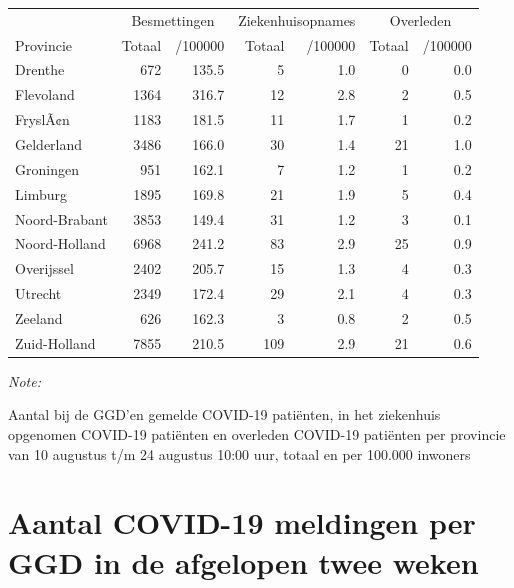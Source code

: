 \documentclass[
  english,
  man,floatsintext]{apa6}
\begin{document}
\begin{table}
\centering
\begin{threeparttable}
\begin{tabular}{lrrrrrr}
\toprule
\multicolumn{1}{c}{ } & \multicolumn{2}{c}{Besmettingen} & \multicolumn{2}{c}{Ziekenhuisopnames} & \multicolumn{2}{c}{Overleden} \\
\cmidrule(l{3pt}r{3pt}){2-3} \cmidrule(l{3pt}r{3pt}){4-5} \cmidrule(l{3pt}r{3pt}){6-7}
Provincie & Totaal & /100000 & Totaal & /100000 & Totaal & /100000\\
\midrule
Drenthe & 672 & 135.5 & 5 & 1.0 & 0 & 0.0\\
Flevoland & 1364 & 316.7 & 12 & 2.8 & 2 & 0.5\\
FryslÃ¢n & 1183 & 181.5 & 11 & 1.7 & 1 & 0.2\\
Gelderland & 3486 & 166.0 & 30 & 1.4 & 21 & 1.0\\
Groningen & 951 & 162.1 & 7 & 1.2 & 1 & 0.2\\
Limburg & 1895 & 169.8 & 21 & 1.9 & 5 & 0.4\\
Noord-Brabant & 3853 & 149.4 & 31 & 1.2 & 3 & 0.1\\
Noord-Holland & 6968 & 241.2 & 83 & 2.9 & 25 & 0.9\\
Overijssel & 2402 & 205.7 & 15 & 1.3 & 4 & 0.3\\
Utrecht & 2349 & 172.4 & 29 & 2.1 & 4 & 0.3\\
Zeeland & 626 & 162.3 & 3 & 0.8 & 2 & 0.5\\
Zuid-Holland & 7855 & 210.5 & 109 & 2.9 & 21 & 0.6\\
\bottomrule
\end{tabular}
\begin{tablenotes}
\item \textit{Note: } 
\item Aantal bij de GGD’en gemelde COVID-19 patiënten, in het ziekenhuis opgenomen COVID-19 patiënten en overleden COVID-19 patiënten per provincie van 10 augustus t/m 24 augustus 10:00 uur, totaal en per 100.000 inwoners
\end{tablenotes}
\end{threeparttable}
\end{table}

\newpage

\hypertarget{aantal-covid-19-meldingen-per-ggd-in-de-afgelopen-twee-weken}{%
\section{Aantal COVID-19 meldingen per GGD in de afgelopen twee weken}\label{aantal-covid-19-meldingen-per-ggd-in-de-afgelopen-twee-weken}}
\end{document}
